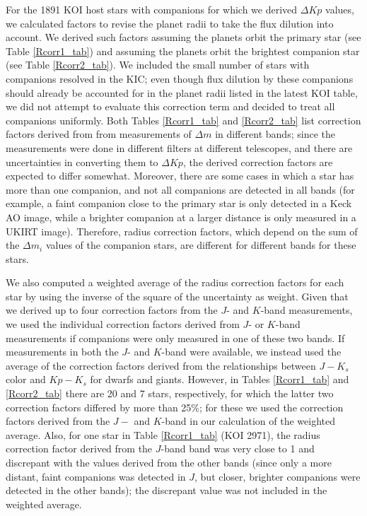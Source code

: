 \documentclass[twocolumn,appendixfloats]{aastex6}
\begin{document}
For the 1891 KOI host stars with companions for which we derived $\Delta Kp$ 
values, we calculated factors to revise the planet radii  to take the flux dilution 
into account. We derived such factors assuming the planets orbit the primary 
star (see Table \ref{Rcorr1_tab}) and assuming the planets orbit the brightest 
companion star (see Table \ref{Rcorr2_tab}). 
We included the small number of stars with companions resolved in the KIC; 
even though flux dilution by these companions should already be accounted for 
in the planet radii listed in the latest KOI table, we did not attempt to evaluate 
this correction term and decided to treat all companions uniformly.
Both Tables \ref{Rcorr1_tab} and \ref{Rcorr2_tab} list correction factors derived 
from from measurements of $\Delta m$ in different bands; since the measurements 
were done in different filters at different telescopes, and there are uncertainties in 
converting them to $\Delta Kp$, the derived correction factors are expected to differ 
somewhat. 
Moreover, there are some cases in which a star has more than one companion,
and not all companions are detected in all bands (for example, a faint companion
close to the primary star is only detected in a Keck AO image, while a brighter 
companion at a larger distance is only measured in a UKIRT image). Therefore,
radius correction factors, which depend on the sum of the $\Delta m_i$ values
of the companion stars, are different for different bands for these stars. 

We also computed a weighted average of the radius correction factors for 
each star by using the inverse of the square of the uncertainty as weight. 
Given that we derived up to four correction factors from the $J$- and 
$K$-band measurements, we used the individual correction factors 
derived from $J$- or $K$-band measurements if companions were 
only measured in one of these two bands. If measurements in both 
the $J$- and $K$-band were available, we instead used the average 
of the correction factors derived from the relationships between $J-K_s$ 
color and $Kp-K_s$ for dwarfs and giants. However, in Tables \ref{Rcorr1_tab}
and \ref{Rcorr2_tab} there are 20 and 7 stars, respectively, for which the 
latter two correction factors differed by more than 25\%; for these we used 
the correction factors derived from the $J-$ and $K$-band in our calculation 
of the weighted average. Also, for one star in Table \ref{Rcorr1_tab} (KOI 2971),
the radius correction factor derived from the $J$-band band was very close to 1
and discrepant with the values derived from the other bands (since only a more
distant, faint companions was detected in $J$, but closer, brighter companions 
were detected in the other bands); the discrepant value was not included in 
the weighted average. 
\end{document}
